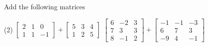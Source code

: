 \documentclass{ximera}
\begin{document}
\begin{exercise}%
    Add the following matrices
    \begin{tasks}(2)
        \task
        $\begin{bmatrix}
            2 & 1 & 0 \\
            1 & 1 & -1
        \end{bmatrix}
        +
        \begin{bmatrix}
            5 & 3 & 4 \\
            1 & 2 & 5
        \end{bmatrix}$
        \task
        $\begin{bmatrix}
            6 & -2 & 3 \\
            7 & 3 & 3 \\
            8 & -1 & 2
        \end{bmatrix}
        +
        \begin{bmatrix}
            -1 & -1 & -3 \\
            6 & 7 & 3 \\
            -9 & 4 & -1
        \end{bmatrix}$
    \end{tasks}
\end{exercise}
\end{document}
